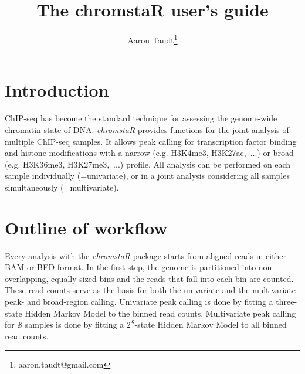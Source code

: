 \documentclass[11pt]{article}\usepackage[]{graphicx}\usepackage[]{color}
\author{Aaron Taudt\footnote{aaron.taudt@gmail.com}}
\newcommand{\Rpackage}[1]{{\textit{#1}}}
\begin{document}
\title{The chromstaR user's guide}

\maketitle

\tableofcontents
\section{Introduction}

ChIP-seq has become the standard technique for assessing the genome-wide chromatin state of DNA. \Rpackage{chromstaR} provides functions for the joint analysis of multiple ChIP-seq samples. It allows peak calling for transcription factor binding and histone modifications with a narrow (e.g. H3K4me3, H3K27ac,~...) or broad (e.g. H3K36me3, H3K27me3,~...) profile. All analysis can be performed on each sample individually (=univariate), or in a joint analysis considering all samples simultaneously (=multivariate).



\section{Outline of workflow}

Every analysis with the \Rpackage{chromstaR} package starts from aligned reads in either BAM or BED format. In the first step, the genome is partitioned into non-overlapping, equally sized bins and the reads that fall into each bin are counted. These read counts serve as the basis for both the univariate and the multivariate peak- and broad-region calling. Univariate peak calling is done by fitting a three-state Hidden Markov Model to the binned read counts. Multivariate peak calling for $\mathcal{S}$ samples is done by fitting a $2^\mathcal{S}$-state Hidden Markov Model to all binned read counts.
\end{document}
